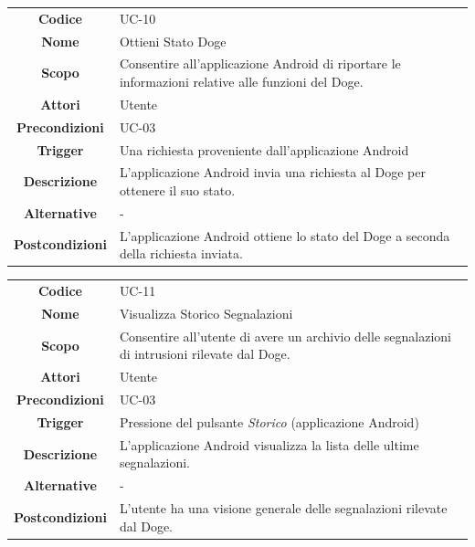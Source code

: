 \documentclass{article}
\begin{document}
\begin{adjustbox}{center}
\begin{tabular}{|c|p{10cm}|}
\hline
\textbf{Codice} & UC-10 \\
\textbf{Nome} & Ottieni Stato Doge \\
\textbf{Scopo} & Consentire all'applicazione Android di riportare le informazioni relative alle funzioni del Doge. \\
\textbf{Attori} & Utente \\
\textbf{Precondizioni} & UC-03 \\
\textbf{Trigger} & Una richiesta proveniente dall'applicazione Android \\
\textbf{Descrizione} & L'applicazione Android invia una richiesta al Doge per ottenere il suo stato. \\
\textbf{Alternative} & - \\
\textbf{Postcondizioni} & L'applicazione Android ottiene lo stato del Doge a seconda della richiesta inviata. \\
\hline
\end{tabular}
\end{adjustbox}

\begin{adjustbox}{center}
\begin{tabular}{|c|p{10cm}|}
\hline
\textbf{Codice} & UC-11 \\
\textbf{Nome} & Visualizza Storico Segnalazioni \\
\textbf{Scopo} & Consentire all'utente di avere un archivio delle segnalazioni di intrusioni rilevate dal Doge. \\
\textbf{Attori} & Utente \\
\textbf{Precondizioni} & UC-03 \\
\textbf{Trigger} & Pressione del pulsante \emph{Storico} (applicazione Android) \\
\textbf{Descrizione} & L'applicazione Android visualizza la lista delle ultime segnalazioni. \\
\textbf{Alternative} & - \\
\textbf{Postcondizioni} & L'utente ha una visione generale delle segnalazioni rilevate dal Doge. \\
\hline
\end{tabular}
\end{adjustbox}
\end{document}
